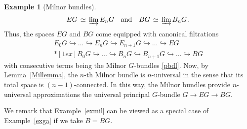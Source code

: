 \documentclass[11pt]{amsart}
\theoremstyle{definition}
\newtheorem{example}[theorem]{Example}
\theoremstyle{remark}
\numberwithin{equation}{section}
\newcommand{\la}{\label}
\begin{document}
\begin{example}[Milnor bundles]
\begin{equation*}
\la{defbg} EG\, \simeq \, \varinjlim E_nG \quad \text{and} \quad BG \,\simeq\, \varinjlim B_nG\,. 
\end{equation*}
%
Thus, the spaces $EG$ and $BG$ come equipped with canonical filtrations 
%
\begin{eqnarray*}
\la{efilt} E_0G \hookrightarrow \ldots \hookrightarrow E_nG \hookrightarrow E_{n+1}G \hookrightarrow \ldots \hookrightarrow EG\\*[1ex]
\la{bfilt} 
B_0G \hookrightarrow \ldots \hookrightarrow B_nG \hookrightarrow B_{n+1}G \hookrightarrow \ldots \hookrightarrow BG
\end{eqnarray*}
%
with consecutive terms being the Milnor $G$-bundles \eqref{pbdl}.
Now, by Lemma~\ref{Millemma}, the $n$-th Milnor bundle is $n$-universal in the sense that its total space is $(n-1)$-connected. In this way, the Milnor bundles provide $n$-universal
approximations the universal principal $G$-bundle $G \to EG \to BG $.
\end{example}
%
We remark that Example~\ref{exmil} can be viewed as a special case of Example~\ref{exga} if we take $ B = BG $.
\end{document}
